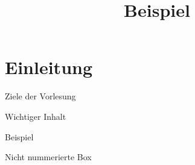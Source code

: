 \documentclass{cheatsheet}
\title{Beispiel}
\begin{document}
    \section{Einleitung}
    \begin{sectionbox}{Ziele der Vorlesung}
        \begin{warningbox}{Wichtiger Inhalt}
        \end{warningbox}
        \begin{hintbox}{Beispiel}
        \end{hintbox}
    \end{sectionbox}
    \begin{normbox}{Nicht nummerierte Box}
    \end{normbox}
\end{document}
